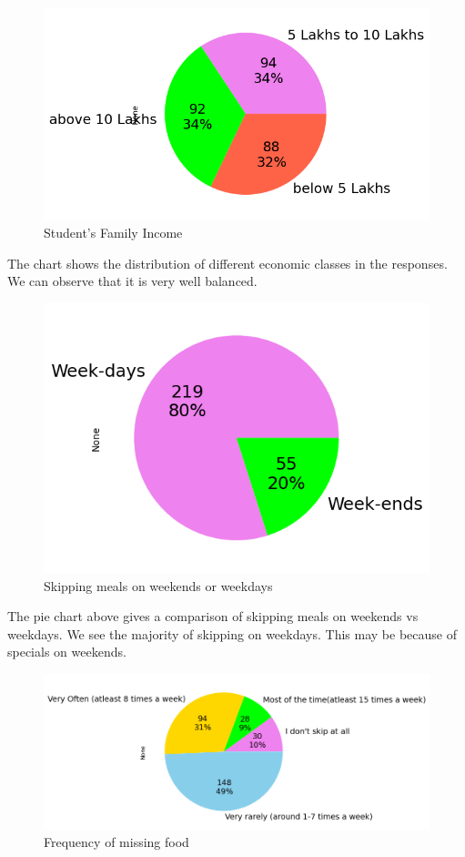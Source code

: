 \documentclass{article}
\begin{document}
\begin{figure}[H]
    \centering
    \includegraphics[scale = 0.9]{pie_income.png}
    \caption{Student's Family Income}  
    \label{Normality_plot}
\end{figure}
The chart shows the distribution of different economic classes in the responses. We can observe that it is very well balanced.
\begin{figure}[H]
    \centering
    \includegraphics[scale = 0.9]{pie_plot_weekdays.png}
    \caption{Skipping meals on weekends or weekdays}  
    \label{Normality_plot}
\end{figure}
The pie chart above gives a comparison of skipping meals on weekends vs weekdays. We see the majority of skipping on weekdays. This may be because of specials on weekends.
\begin{figure}[H]
    \centering
    \includegraphics[scale = 0.75]{pie_skip_categoty.png}
    \caption{Frequency of missing food}  
    \label{Normality_plot}
\end{figure}
\end{document}
